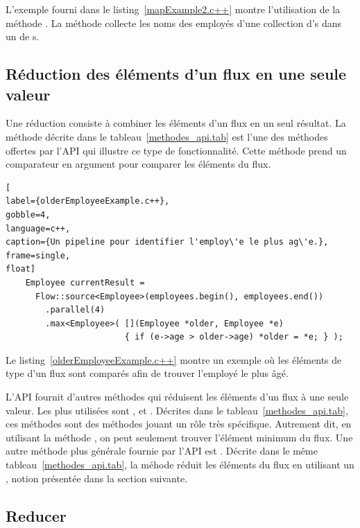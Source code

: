 L'exemple fourni dans le listing~\ref{mapExample2.c++} montre l'utilisation de la m\'ethode . La m\'ethode collecte les noms des employ\'es d'une collection d's dans un  de s.


\subsection{R\'eduction des \'el\'ements d'un flux en une seule valeur}

Une r\'eduction
consiste \`a combiner les \'el\'ements d'un flux en un seul r\'esultat. La m\'ethode  d\'ecrite dans le tableau~\ref{methodes_api.tab} est l'une des m\'ethodes offertes par l'{API} qui illustre ce type de fonctionnalit\'e. Cette m\'ethode prend un comparateur en argument pour comparer les \'el\'ements du flux. 

\begin{lstlisting}[
label={olderEmployeeExample.c++},
gobble=4,
language=c++,
caption={Un pipeline pour identifier l'employ\'e le plus ag\'e.},
frame=single,
float]
    Employee currentResult = 
      Flow::source<Employee>(employees.begin(), employees.end())
        .parallel(4)
        .max<Employee>( [](Employee *older, Employee *e) 
                        { if (e->age > older->age) *older = *e; } );
\end{lstlisting}



Le listing~\ref{olderEmployeeExample.c++} montre un exemple o\`u les \'el\'ements de type  d'un flux sont compar\'es afin de trouver l'employ\'e le plus \^ag\'e.


L'{API} fournit d'autres m\'ethodes qui r\'eduisent les \'el\'ements d'un flux \`a une seule valeur. Les plus utilis\'ees sont ,  et . D\'ecrites dans le tableau~\ref{methodes_api.tab}, ces m\'ethodes sont des m\'ethodes jouant un r\^ole tr\`es sp\'ecifique. Autrement dit, en utilisant la m\'ethode , on peut seulement trouver l'\'el\'ement minimum du flux. Une autre m\'ethode plus g\'en\'erale fournie par l'{API} est . D\'ecrite dans le m\^eme tableau~\ref{methodes_api.tab}, la m\'ehode  r\'eduit les \'el\'ements du flux en utilisant un , notion pr\'esent\'ee dans la section suivante.






\subsection{Reducer}

